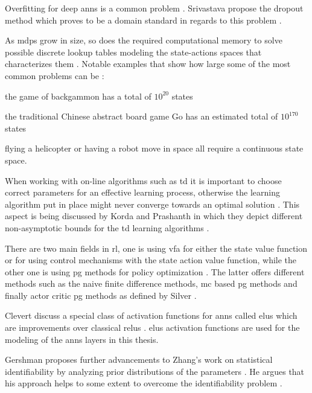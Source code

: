 \documentclass{seal_thesis}
\begin{document}
Overfitting for deep \glspl{ann} is a common problem \cite[p. 218]{Sutton2017}. Srivastava \etal propose the dropout method which proves to be a domain standard in regards to this problem \cite{Srivastava2014}.

As \glspl{mdp} grow in size, so does the required computational memory to solve possible discrete lookup tables modeling the state-actions spaces that characterizes them \cite{Sutton2017}. Notable examples that show how large some of the most common problems can be \cite{Sutton2017}:
\begin{enumerate*}
	\item the game of backgammon has a total of $10^{20}$ states
	\item the traditional Chinese abstract board game Go has an estimated total of $10^{170}$ states
	\item flying a helicopter or having a robot move in space all require a continuous state space.
\end{enumerate*}

When working with on-line algorithms such as \gls{td} it is important to choose correct parameters for an effective learning process, otherwise the learning algorithm put in place might never converge towards an optimal solution \cite{Sutton2017}. This aspect is being discussed by Korda and Prashanth in which they depict different non-asymptotic bounds for the \gls{td} learning algorithms \cite{Korda2014}.

There are two main fields in \gls{rl}, one is using \gls{vfa} for either the state value function or for using control mechanisms with the state action value function, while the other one is using \gls{pg} methods for policy optimization \cite{Sutton2017}. The latter offers different methods such as the naive finite difference methods, \gls{mc} based \gls{pg} methods and finally actor critic \gls{pg} methods as defined by Silver \etal \cite{Silver2014}.

Clevert \etal discuss a special class of activation functions for \glspl{ann} called \glspl{elu} which are improvements over classical \glspl{relu} \cite{Clevert2015}. \glspl{elu} activation functions are used for the modeling of the \glspl{ann} layers in this thesis.

Gershman proposes further advancements to Zhang's work on statistical identifiability \cite{Zhang2011} by analyzing prior distributions of the parameters \cite{Gershman2016}. He argues that his approach helps to some extent to overcome the identifiability problem \cite{Gershman2016}.
\end{document}
